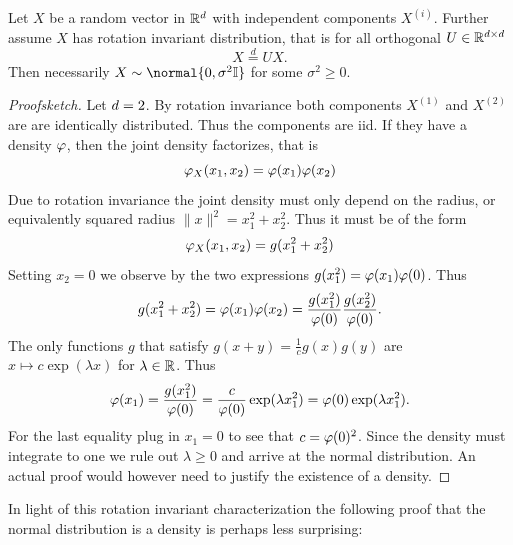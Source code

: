\begin{fact}
    Let \(X\) be a random vector in \(\mathbb{R}^d\) with independent components
    \(X^{(i)}\). Further assume \(X\) has rotation invariant distribution, that is
    for all orthogonal \(U\in \mathbb{R}^{d\times d}\)
    \[
        X \overset{d}= U X.
    \]
    Then necessarily \(X\sim \normal{0, \sigma^2 \identity}\) for some \(\sigma^2 \ge 0\).
\end{fact}
\begin{proof}[Proofsketch]
    Let \(d=2\). By rotation invariance both components \(X^{(1)}\) and
    \(X^{(2)}\) are are identically distributed. Thus the components are iid. If
    they have a density \(\varphi\), then the joint density factorizes, that is
    \[
        \varphi_X(x_1, x_2) = \varphi(x_1) \varphi(x_2)
    \]
    Due to rotation invariance the joint density must only depend on the
    radius, or equivalently squared radius \(\|x\|^2 = x_1^2 + x_2^2\).
    Thus it must be of the form
    \[
        \varphi_X(x_1, x_2) = g(x_1^2 + x_2^2)
    \]
    Setting \(x_2=0\) we observe by the two expressions \(g(x_1^2) = \varphi(x_1)\varphi(0)\).
    Thus
    \[
        g(x_1^2 + x_2^2) = \varphi(x_1) \varphi(x_2) = \frac{g(x_1^2)}{\varphi(0)} \frac{g(x_2^2)}{\varphi(0)}.
    \]
    The only functions \(g\) that satisfy \(g(x+y) = \frac1c g(x) g(y)\) are \(x\mapsto c\exp(\lambda x)\)
    for \(\lambda\in \mathbb{R}\). Thus
    \[
        \varphi(x_1) = \frac{g(x_1^2)}{\varphi(0)} = \frac{c}{\varphi(0)} \exp(\lambda x_1^2)
        = \varphi(0) \exp(\lambda x_1^2).
    \]
    For the last equality plug in \(x_1=0\) to see that \(c = \varphi(0)^2\).
    Since the density must integrate to one we rule out \(\lambda \ge 0\) and
    arrive at the normal distribution. An actual proof would
    however need to justify the existence of a density.
\end{proof}

In light of this rotation invariant characterization the following proof that
the normal distribution is a density is perhaps less surprising:

